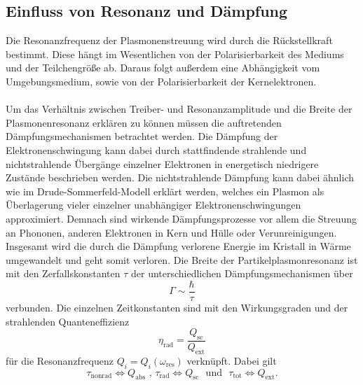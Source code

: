 \subsection{Einfluss von Resonanz und Dämpfung}
Die Resonanzfrequenz der Plasmonenstreuung wird durch die Rückstellkraft bestimmt. Diese hängt im Wesentlichen von der Polarisierbarkeit des Mediums und der Teilchengröße ab. Daraus folgt außerdem eine Abhängigkeit vom Umgebungsmedium, sowie von der Polarisierbarkeit der Kernelektronen.\\
\\
Um das Verhältnis zwischen Treiber- und Resonanzamplitude und die Breite der Plasmonenresonanz erklären zu können müssen die auftretenden Dämpfungsmechanismen betrachtet werden. Die Dämpfung der Elektronenschwingung kann dabei durch stattfindende strahlende und nichtstrahlende Übergänge einzelner Elektronen in energetisch niedrigere Zustände beschrieben werden.
Die nichtstrahlende Dämpfung kann dabei ähnlich wie im Drude-Sommerfeld-Modell erklärt werden, welches ein Plasmon als Überlagerung vieler einzelner unabhängiger Elektronenschwingungen approximiert. Demnach sind wirkende Dämpfungsprozesse vor allem die Streuung an Phononen, anderen Elektronen in Kern und Hülle oder Verunreinigungen. Insgesamt wird die durch die Dämpfung verlorene Energie im Kristall in Wärme umgewandelt und geht somit verloren. \cite{anleitung}
Die Breite der Partikelplasmonresonanz ist mit den Zerfallskonstanten $\tau$ der unterschiedlichen Dämpfungsmechanismen über
\begin{equation}
  \Gamma \sim \frac{\hbar}{\tau}
\end{equation}
verbunden.\cite{sonne} Die einzelnen Zeitkonstanten sind mit den Wirkungsgraden und der strahlenden Quanteneffizienz
\begin{equation}
  \eta_{\text{rad}} = \frac{Q_{\text{sc}}}{Q_{\text{ext}}}
\end{equation}
für die Resonanzfrequenz $Q_i=Q_i(\omega_{\text{res}})$ verknüpft.
Dabei gilt
\begin{equation}
  \tau_{\text{nonrad}} \iff Q_{\text{abs}} \,\,\text{,}\,\, \tau_{\text{rad}} \iff Q_{\text{sc}} \,\,\,\, \text{und} \,\,\,\, \tau_{\text{tot}} \iff Q_{\text{ext}}.
\end{equation}
